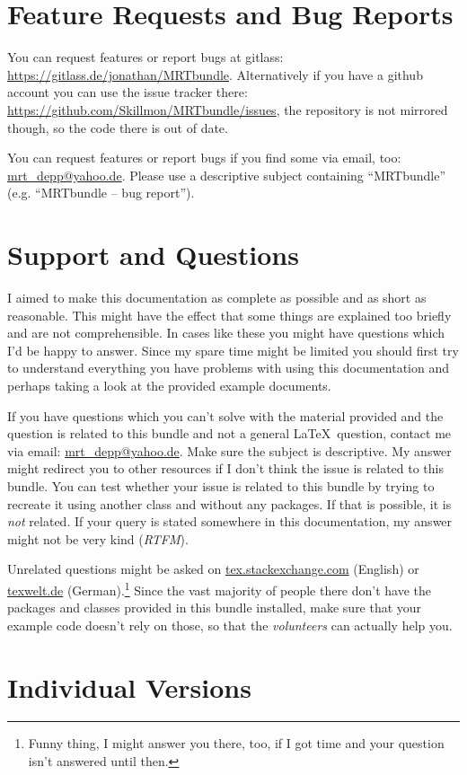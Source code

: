 \section{Feature Requests and Bug Reports}\label{sec:bugs}
You can request features or report bugs at gitlass:
\url{https://gitlass.de/jonathan/MRTbundle}. Alternatively if you have a github
account you can use the issue tracker there:
\url{https://github.com/Skillmon/MRTbundle/issues}, the repository is not
mirrored though, so the code there is out of date.

You can request features or report bugs if you find some via
email, too:
\href{mailto:mrt_depp@yahoo.de?subject=MRTbundle -- bug report}
  {mrt\_depp@yahoo.de}.
Please use a descriptive subject containing ``MRTbundle'' (e.g. ``MRTbundle --
bug report'').

\section{Support and Questions}
I aimed to make this documentation as complete as possible and as short as
reasonable. This might have the effect that some things are explained too
briefly and are not comprehensible. In cases like these you might have questions
which I'd be happy to answer. Since my spare time might be limited you should
first try to understand everything you have problems with using this
documentation and perhaps taking a look at the provided example documents.

If you have questions which you can't solve with the material provided and the
question is related to this bundle and not a general \LaTeX\ question, contact
me via email:
\href{mailto:mrt_depp@yahoo.de?subject=MRTbundle -- support}
  {mrt\_depp@yahoo.de}.
Make sure the subject is descriptive. My answer might redirect you to other
resources if I don't think the issue is related to this bundle. You can test
whether your issue is related to this bundle by trying to recreate it using
another class and without any  packages. If that is possible, it is
\emph{not} related. If your query is stated somewhere in this documentation, my
answer might not be very kind (\!\emph{RTFM}).

Unrelated questions might be asked on \url{tex.stackexchange.com} (English) or
\url{texwelt.de} (German).\footnote{Funny thing, I might answer you there, too,
if I got time and your question isn't answered until then.} Since the vast
majority of people there don't have the packages and classes provided in this
bundle installed, make sure that your example code doesn't rely on those, so
that the \emph{volunteers} can actually help you.

\section{Individual Versions}
\docIndividualVersions
